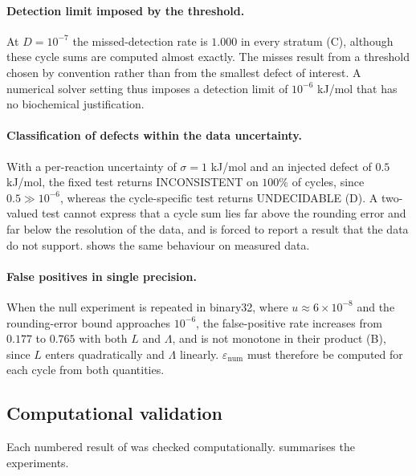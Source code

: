 \documentclass[11pt,a4paper]{article}
\theoremstyle{pstyle}
\theoremstyle{definition}
\theoremstyle{remark}
\newcommand{\eps}{\varepsilon}
\newcommand{\epsnum}{\eps_{\mathrm{num}}}
\newcommand{\mach}{u}
\begin{document}
\paragraph{Detection limit imposed by the threshold.} At $D=10^{-7}$ the
missed-detection rate is $1.000$ in every stratum
(C), although these cycle sums are computed almost
exactly. The misses result from a threshold chosen by convention rather
than from the smallest defect of interest. A numerical solver setting
thus imposes a detection limit of $10^{-6}$ kJ/mol that has no
biochemical justification.

\paragraph{Classification of defects within the data uncertainty.} With
a per-reaction uncertainty of $\sigma=1$ kJ/mol and an injected defect of
$0.5$ kJ/mol, the fixed test returns \textsf{INCONSISTENT} on $100\%$ of
cycles, since $0.5 \gg 10^{-6}$, whereas the cycle-specific test returns
\textsf{UNDECIDABLE} (D). A two-valued test cannot
express that a cycle sum lies far above the rounding error and far
below the resolution of the data, and is forced to report a result that
the data do not support.  shows the same behaviour on
measured data.

\paragraph{False positives in single precision.} When the null
experiment is repeated in binary32, where $\mach\approx6\times10^{-8}$
and the rounding-error bound approaches $10^{-6}$, the false-positive
rate increases from $0.177$ to $0.765$ with both $L$ and $\Lambda$, and
is not monotone in their product (B), since $L$
enters  quadratically and $\Lambda$ linearly.
$\epsnum$ must therefore be computed for each cycle from both
quantities.

\subsection{Computational validation}
\label{sec:validation}

Each numbered result of  was checked computationally.
 summarises the experiments.
\end{document}

